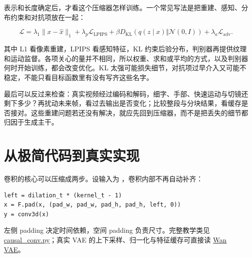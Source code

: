 表示和长度确定后，才看这个压缩器怎样训练。一个常见写法是把重建、感知、分布约束和对抗项放在一起：

\[
\mathcal{L}=\lambda_1\lVert x-\hat{x}\rVert_1
+\lambda_p\mathcal{L}_{\mathrm{LPIPS}}
+\beta D_{\mathrm{KL}}\left(q(z\mid x)\Vert\mathcal{N}(0,I)\right)
+\lambda_a\mathcal{L}_{\mathrm{adv}}.
\]

其中 L1 看像素重建，LPIPS 看感知特征，KL 约束后验分布，判别器再提供纹理和运动监督。各项关心的量并不相同，所以权重、求和或平均的方式，以及判别器何时开始训练，都会改变优化。KL 太强可能损失细节，对抗项过早介入又可能不稳定，不能只看目标函数里有没有写齐这些名字。

最后可以反过来检查：真实视频经过编码和解码，细字、手部、快速运动与切镜还剩下多少？再扰动未来帧，看过去输出是否变化；比较整段与分块结果，看缓存是否接对。这些重建问题若还没有解决，就应先回到压缩器，而不是把丢失的细节都归因于生成主干。

\section{从极简代码到真实实现}\label{seedance-m01-ux4eceux6781ux7b80ux4ee3ux7801ux5230ux771fux5b9eux5b9eux73b0}

卷积的核心可以压缩成两步。设输入为 ，卷积内部不再自动补齐：

\begin{verbatim}
left = dilation_t * (kernel_t - 1)
x = F.pad(x, (pad_w, pad_w, pad_h, pad_h, left, 0))
y = conv3d(x)
\end{verbatim}

左侧 padding 决定时间依赖，空间 padding 负责尺寸。完整教学类见 \hyperref[code-causal-conv]{causal\_conv.py}；真实 VAE 的上下采样、归一化与特征缓存可直接读 \href{https://github.com/Wan-Video/Wan2.1/blob/9737cba9c1c3c4d04b33fcad41c111989865d315/wan/modules/vae.py}{Wan VAE}。
